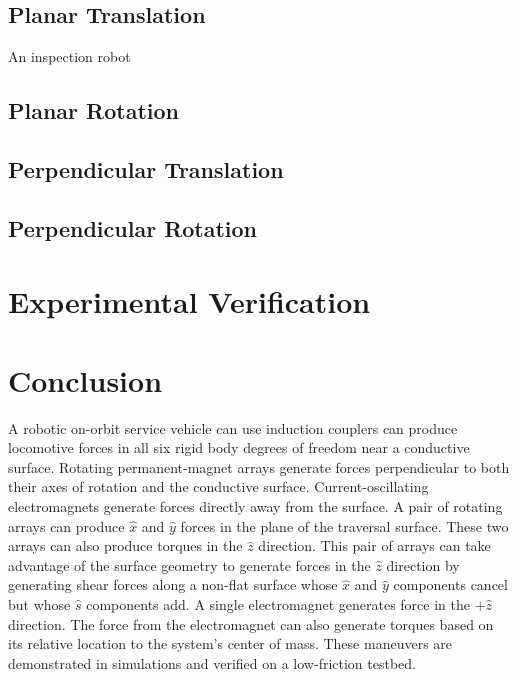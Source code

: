 \documentclass[10pt]{article}
\begin{document}
\subsection{Planar Translation}
An inspection robot 
\subsection{Planar Rotation}
\subsection{Perpendicular Translation}
\subsection{Perpendicular Rotation}
\section{Experimental Verification}\label{sec:experiments}
\section{Conclusion}
A robotic on-orbit service vehicle can use induction couplers can produce locomotive forces in all six rigid body degrees of freedom near a conductive surface. Rotating permanent-magnet arrays generate forces perpendicular to both their axes of rotation and the conductive surface. Current-oscillating electromagnets generate forces directly away from the surface. A pair of rotating arrays can produce $\hat{x}$ and $\hat{y}$ forces in the plane of the traversal surface. These two arrays can also produce torques in the $\hat{z}$ direction. This pair of arrays can take advantage of the surface geometry to generate forces in the $\hat{z}$ direction by generating shear forces along a non-flat surface whose $\hat{x}$ and $\hat{y}$ components cancel but whose $\hat{s}$ components add. A single electromagnet generates force in the $+\hat{z}$ direction. The force from the electromagnet can also generate torques based on its relative location to the system's center of mass. These maneuvers are demonstrated in simulations and verified on a low-friction testbed.  
\end{document}
